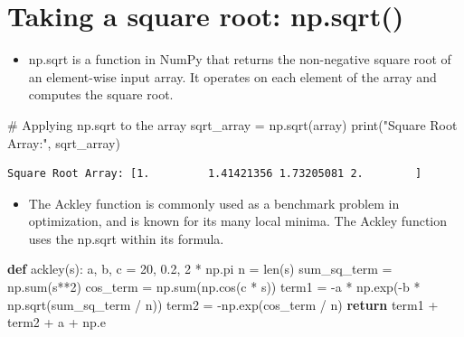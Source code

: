 \documentclass[
  letterpaper,
  DIV=11,
  numbers=noendperiod]{scrreprt}
\newenvironment{Shaded}{\begin{snugshade}}{\end{snugshade}}
\newcommand{\BuiltInTok}[1]{\textcolor[rgb]{0.00,0.23,0.31}{#1}}
\newcommand{\CommentTok}[1]{\textcolor[rgb]{0.37,0.37,0.37}{#1}}
\newcommand{\ControlFlowTok}[1]{\textcolor[rgb]{0.00,0.23,0.31}{\textbf{#1}}}
\newcommand{\DecValTok}[1]{\textcolor[rgb]{0.68,0.00,0.00}{#1}}
\newcommand{\FloatTok}[1]{\textcolor[rgb]{0.68,0.00,0.00}{#1}}
\newcommand{\KeywordTok}[1]{\textcolor[rgb]{0.00,0.23,0.31}{\textbf{#1}}}
\newcommand{\NormalTok}[1]{\textcolor[rgb]{0.00,0.23,0.31}{#1}}
\newcommand{\OperatorTok}[1]{\textcolor[rgb]{0.37,0.37,0.37}{#1}}
\newcommand{\StringTok}[1]{\textcolor[rgb]{0.13,0.47,0.30}{#1}}
\providecommand{\tightlist}{%
  \setlength{\itemsep}{0pt}\setlength{\parskip}{0pt}}\usepackage{longtable,booktabs,array}
\begin{document}
\section{Taking a square root:
np.sqrt()}\label{taking-a-square-root-np.sqrt}

\begin{itemize}
\tightlist
\item
  np.sqrt is a function in NumPy that returns the non-negative square
  root of an element-wise input array. It operates on each element of
  the array and computes the square root.
\end{itemize}

\begin{Shaded}
\begin{Highlighting}[]
\CommentTok{\# Applying np.sqrt to the array}
\NormalTok{sqrt\_array }\OperatorTok{=}\NormalTok{ np.sqrt(array)}
\BuiltInTok{print}\NormalTok{(}\StringTok{"Square Root Array:"}\NormalTok{, sqrt\_array)}
\end{Highlighting}
\end{Shaded}

\begin{verbatim}
Square Root Array: [1.         1.41421356 1.73205081 2.        ]
\end{verbatim}

\begin{itemize}
\tightlist
\item
  The Ackley function is commonly used as a benchmark problem in
  optimization, and is known for its many local minima. The Ackley
  function uses the np.sqrt within its formula.
\end{itemize}

\begin{Shaded}
\begin{Highlighting}[]
\KeywordTok{def}\NormalTok{ ackley(s):}
\NormalTok{     a, b, c }\OperatorTok{=} \DecValTok{20}\NormalTok{, }\FloatTok{0.2}\NormalTok{, }\DecValTok{2} \OperatorTok{*}\NormalTok{ np.pi}
\NormalTok{     n }\OperatorTok{=} \BuiltInTok{len}\NormalTok{(s)}
\NormalTok{     sum\_sq\_term }\OperatorTok{=}\NormalTok{ np.}\BuiltInTok{sum}\NormalTok{(s}\OperatorTok{**}\DecValTok{2}\NormalTok{)}
\NormalTok{     cos\_term }\OperatorTok{=}\NormalTok{ np.}\BuiltInTok{sum}\NormalTok{(np.cos(c }\OperatorTok{*}\NormalTok{ s))}
\NormalTok{     term1 }\OperatorTok{=} \OperatorTok{{-}}\NormalTok{a }\OperatorTok{*}\NormalTok{ np.exp(}\OperatorTok{{-}}\NormalTok{b }\OperatorTok{*}\NormalTok{ np.sqrt(sum\_sq\_term }\OperatorTok{/}\NormalTok{ n))}
\NormalTok{     term2 }\OperatorTok{=} \OperatorTok{{-}}\NormalTok{np.exp(cos\_term }\OperatorTok{/}\NormalTok{ n)}
     \ControlFlowTok{return}\NormalTok{ term1 }\OperatorTok{+}\NormalTok{ term2 }\OperatorTok{+}\NormalTok{ a }\OperatorTok{+}\NormalTok{ np.e}
\end{Highlighting}
\end{Shaded}
\end{document}
